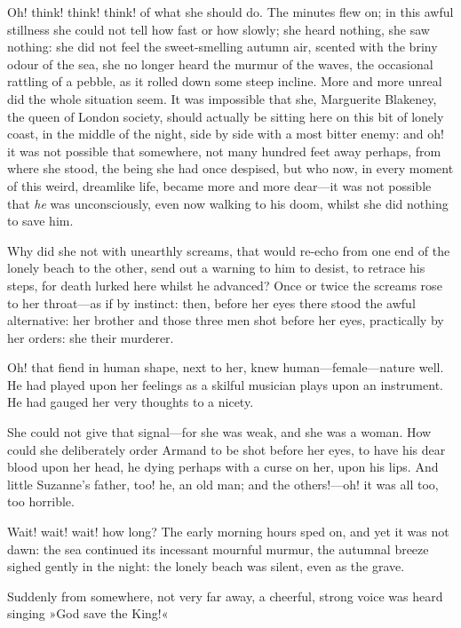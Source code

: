 Oh! think! think! think! of what she should do. The minutes flew on; in this awful stillness she could not tell how fast or how slowly; she heard nothing, she saw nothing: she did not feel the sweet-smelling autumn air, scented with the briny odour of the sea, she no longer heard the murmur of the waves, the occasional rattling of a pebble, as it rolled down some steep incline. More and more unreal did the whole situation seem. It was impossible that she, Marguerite Blakeney, the queen of London society, should actually be sitting here on this bit of lonely coast, in the middle of the night, side by side with a most bitter enemy: and oh! it was not possible that somewhere, not many hundred feet away perhaps, from where she stood, the being she had once despised, but who now, in every moment of this weird, dreamlike life, became more and more dear\allowbreak---\allowbreak it was not possible that \textit{he} was unconsciously, even now walking to his doom, whilst she did nothing to save him.

Why did she not with unearthly screams, that would re-echo from one end of the lonely beach to the other, send out a warning to him to desist, to retrace his steps, for death lurked here whilst he advanced? Once or twice the screams rose to her throat\allowbreak---\allowbreak as if by instinct: then, before her eyes there stood the awful alternative: her brother and those three men shot before her eyes, practically by her orders: she their murderer.

Oh! that fiend in human shape, next to her, knew human\allowbreak---\allowbreak female\allowbreak---\allowbreak nature well. He had played upon her feelings as a skilful musician plays upon an instrument. He had gauged her very thoughts to a nicety.

She could not give that signal\allowbreak---\allowbreak for she was weak, and she was a woman. How could she deliberately order Armand to be shot before her eyes, to have his dear blood upon her head, he dying perhaps with a curse on her, upon his lips. And little Suzanne's father, too! he, an old man; and the others!\allowbreak---\allowbreak oh! it was all too, too horrible.

Wait! wait! wait! how long? The early morning hours sped on, and yet it was not dawn: the sea continued its incessant mournful murmur, the autumnal breeze sighed gently in the night: the lonely beach was silent, even as the grave.

Suddenly from somewhere, not very far away, a cheerful, strong voice was heard singing »God save the King!«